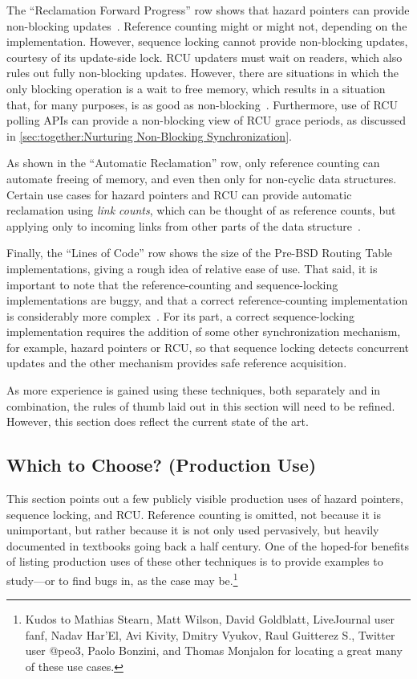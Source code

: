 The ``Reclamation Forward Progress'' row shows that hazard pointers
can provide non-blocking updates~\cite{MagedMichael04a,HerlihyLM02}.
Reference counting might or might not, depending on the implementation.
However, sequence locking cannot provide non-blocking updates, courtesy
of its update-side lock.
RCU updaters must wait on readers, which also rules out fully non-blocking
updates.
However, there are situations in which the only blocking operation is
a wait to free memory, which results in a situation that, for many
purposes, is as good as non-blocking~\cite{MathieuDesnoyers2012URCU}.
Furthermore, use of RCU polling APIs can provide a non-blocking
view of RCU grace periods, as discussed in
\cref{sec:together:Nurturing Non-Blocking Synchronization}.

As shown in the ``Automatic Reclamation'' row, only reference
counting can automate freeing of memory, and even then only
for non-cyclic data structures.
Certain use cases for hazard pointers and RCU can provide automatic
reclamation using \emph{link counts}, which can be thought of as
reference counts, but applying only to incoming links from other
parts of the data structure~\cite{MagedMichael2018FollyHazptr}.

Finally, the ``Lines of Code'' row shows the size of the Pre-BSD
Routing Table implementations, giving a rough idea of relative ease of use.
That said, it is important to note that the reference-counting and
sequence-locking implementations are buggy, and that a correct
reference-counting implementation is considerably
more complex~\cite{Valois95a,MagedMichael95a}.
For its part, a correct sequence-locking implementation requires
the addition of some other synchronization mechanism, for example,
hazard pointers or RCU, so that sequence locking detects concurrent
updates and the other mechanism provides safe reference acquisition.

As more experience is gained using these techniques, both separately
and in combination, the rules of thumb laid out in this section will
need to be refined.
However, this section does reflect the current state of the art.

\subsection{Which to Choose?
			     (Production Use)}
\label{sec:defer:Which to Choose? (Production Use)}

This section points out a few publicly visible production uses of
hazard pointers, sequence locking, and RCU\@.
Reference counting is omitted, not because it is unimportant, but rather
because it is not only used pervasively, but heavily documented in textbooks
going back a half century.
One of the hoped-for benefits of listing production uses of these other
techniques is to provide examples to study---or to find bugs in, as
the case may be.\footnote{
	Kudos to Mathias Stearn, Matt Wilson, David Goldblatt, LiveJournal
	user fanf, Nadav Har'El, Avi Kivity, Dmitry Vyukov, Raul Guitterez
	S., Twitter user @peo3, Paolo Bonzini, and Thomas Monjalon for
	locating a great many of these use cases.}

